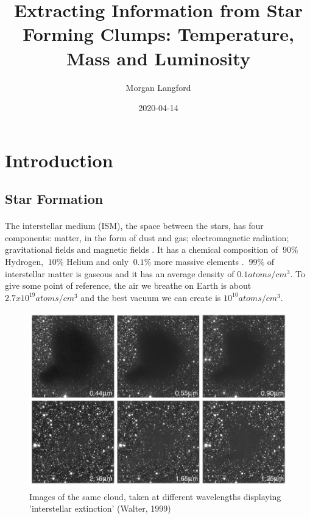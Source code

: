 \documentclass{article}
\title{Extracting Information from Star Forming Clumps: Temperature, Mass and Luminosity}
\date{2020-04-14}
\author{Morgan Langford}
\begin{document}
\maketitle
\newpage
{}

\tableofcontents
\newpage

\section{Introduction}
\subsection{Star Formation}
\paragraph{}

The interstellar medium (ISM), the space between the stars, has four components: matter, in the form of dust and gas; electromagnetic radiation; gravitational fields and magnetic fields \cite{Kay2013}. It has a chemical composition of $~90\%$ Hydrogen, $~10\%$ Helium and only $~0.1\%$ more massive elements \cite{Kay2013}. $~99\%$ of interstellar matter is gaseous and it has an average density of $0.1 atoms/cm^3$. To give some point of reference, the air we breathe on Earth is about $2.7 x 10^{19} atoms/cm^3$ and the best vacuum we can create is $10^{10} atoms/cm^3$. 

\begin{figure}[h!]
\includegraphics[width=\linewidth]{dust.jpg}
\caption{Images of the same cloud, taken at different wavelengths displaying 'interstellar extinction' (Walter, 1999)}
\label{fig:dust1}
\end{figure}
\end{document}
